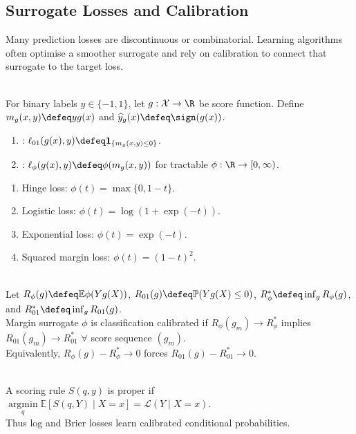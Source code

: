 \subsection{Surrogate Losses and Calibration}

Many prediction losses are discontinuous or combinatorial.  Learning algorithms often optimise a smoother surrogate and rely on calibration to connect that surrogate to the target loss.

\begin{definition} \label{def:sl-surrogate-loss} \\
For binary labels $y\in\{-1,1\}$, let $g:\mathcal{X}\to\R$ be score function. Define $m_g(x,y)\defeq yg(x)$ and $\widehat{y}_g(x)\defeq\sign(g(x))$.
\begin{enumerate}[label=(\roman*)]
\setlength{\itemsep}{0pt}
\item {}: $\ell_{01}(g(x),y)\defeq\mathbf{1}_{\{m_g(x,y)\leq0\}}$.
\item {}: $\ell_\phi(g(x),y)\defeq\phi(m_g(x,y))$ for tractable $\phi:\R\to[0,\infty)$.
\end{enumerate}
\end{definition}

\begin{example} \label{ex:sl-margin-surrogates} 
\begin{enumerate}[label=(\roman*)]
\setlength{\itemsep}{0pt}
\item Hinge loss: $\phi(t)=\max\{0,1-t\}$.
\item Logistic loss: $\phi(t)=\log(1+\exp(-t))$.
\item Exponential loss: $\phi(t)=\exp(-t)$.
\item Squared margin loss: $\phi(t)=(1-t)^2$.
\end{enumerate}
\end{example}

\begin{definition} \label{def:sl-classification-calibration} \\
Let $R_\phi(g)\defeq\mathbb{E}\phi(Yg(X))$, $R_{01}(g)\defeq\mathbb{P}(Yg(X)\leq0)$, $R_\phi^*\defeq\inf_gR_\phi(g)$, and $R_{01}^*\defeq\inf_gR_{01}(g)$.\\
Margin surrogate $\phi$ is classification calibrated if $R_\phi(g_m)\to R_\phi^*$ implies $R_{01}(g_m)\to R_{01}^*$ $\forall$ score sequence $(g_m)$.\\
Equivalently, $R_\phi(g)-R_\phi^*\to0$ forces $R_{01}(g)-R_{01}^*\to0$.
\end{definition}

\begin{remark} \label{rem:sl-proper-scoring-rules} \\
A scoring rule $S(q,y)$ is proper if $\operatorname*{argmin}\limits_q\mathbb{E}[S(q,Y)\mid X=x]=\mathcal{L}(Y\mid X=x)$.\\
Thus log and Brier losses learn calibrated conditional probabilities.
\end{remark}
